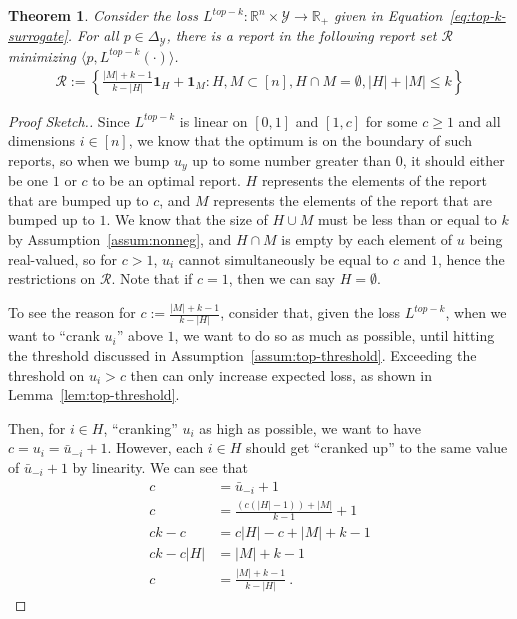 \documentclass[12pt]{article}
\newcommand{\reals}{\mathbb{R}}
\newcommand{\simplex}{\Delta_\Y}
\newcommand{\R}{\mathcal{R}}
\newcommand{\Y}{\mathcal{Y}}
\newcommand{\inprod}[2]{\langle #1, #2 \rangle}%
\newtheorem{theorem}{Theorem}
\begin{document}
\begin{theorem}\label{thm:finite-set}
	Consider the loss $L^{top-k} : \reals^n \times \Y \to \reals_+$ given in Equation~\ref{eq:top-k-surrogate}.  
	For all $p \in \simplex$, there is a report in the following report set $\R$ minimizing $\inprod{p}{L^{top-k}(\cdot)}$.
	\begin{align*}
	\R := \left\{ \frac{|M| + k -1}{k - |H|} \mathbf{1}_H + \mathbf{1}_M : H, M \subset [n], H\cap M = \emptyset, |H| + |M| \leq k \right\}
	\end{align*}
\end{theorem}
\begin{proof}[Proof Sketch.]
	Since $L^{top-k}$ is linear on $[0,1]$ and $[1, c]$ for some $c \geq 1$ and all dimensions $i \in [n]$, we know that the optimum is on the boundary of such reports, so when we bump $u_y$ up to some number greater than $0$, it should either be one $1$ or $c$ to be an optimal report.
	$H$ represents the elements of the report that are bumped up to $c$, and $M$ represents the elements of the report that are bumped up to $1$.
	We know that the size of $H \cup M$ must be less than or equal to $k$ by Assumption~\ref{assum:nonneg}, and $H \cap M$ is empty by each element of $u$ being real-valued, so for $c > 1$, $u_i$ cannot simultaneously be equal to $c$ and $1$, hence the restrictions on $\R$.
	Note that if $c = 1$, then we can say $H = \emptyset$.
	
	To see the reason for $c := \frac{|M| + k -1}{k - |H|}$, consider that, given the loss $L^{top-k}$, when we want to ``crank $u_i$'' above $1$, we want to do so as much as possible, until hitting the threshold discussed in Assumption~\ref{assum:top-threshold}.
	Exceeding the threshold on $u_i > c$ then can only increase expected loss, as shown in Lemma~\ref{lem:top-threshold}.
	
	Then, for $i \in H$, ``cranking'' $u_i$ as high as possible, we want to have $c = u_i = \bar u _{-i} + 1$.
	However, each $i \in H$ should get ``cranked up'' to the same value of $\bar u_{-i} + 1$ by linearity.
	We can see that 
	\begin{align*}
	c &= \bar u_{-i} + 1 \\
	c &= \frac{(c (|H|-1)) + |M|}{k-1} + 1\\
	ck-c &= c|H| - c + |M| + k - 1\\
	ck - c|H| &= |M| + k - 1\\
	c &= \frac{|M|+k-1}{k-|H|}~.~
	\end{align*}
\end{proof}
\end{document}
